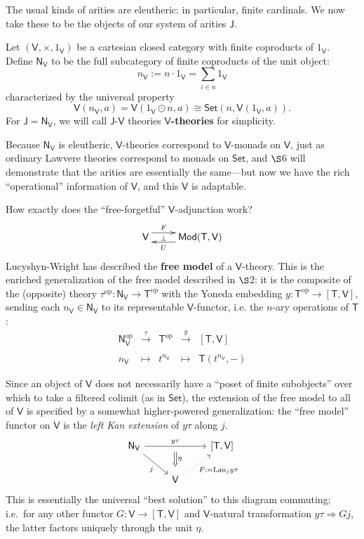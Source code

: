 \documentclass{amsart}
\theoremstyle{definition}
\newcommand{\Set}{\mathsf{Set}}
\newcommand{\Mod}{\mathsf{Mod}}
\newcommand{\NN}{\mathsf{N}}
\newcommand{\V}{\mathsf{V}}
\newcommand{\J}{\mathsf{J}}
\newcommand{\T}{\mathsf{T}}
\newcommand{\op}{\mathrm{op}}
\newcommand{\maps}{\colon}
\begin{document}
The usual kinds of arities are eleutheric: in particular, finite cardinals.  We now take these to be the objects of our system of arities $\J$.

Let $(\V,\times,1_\V)$ be a cartesian closed category with finite coproducts of $1_\V$. Define $\NN_\V$ to be the full subcategory of finite coproducts of the unit object:
\[   n_\V := n \cdot 1_\V = \sum_{i \in n} 1_\V  \]
characterized by the universal property
\begin{equation}
\V(n_\V,a) = \V(1_\V \odot n,a) \cong \Set(n,\V(1_\V,a)).
\end{equation}
For $\J = \NN_\V$, we will call $\J$-$\V$ theories \textbf{$\V$-theories} for simplicity.

Because $\NN_\V$ is eleutheric, $\V$-theories correspond to $\V$-monads on $\V$, just as ordinary Lawvere theories correspond to monads on $\Set$, and $\S$6 will demonstrate that the arities are essentially the same---but now we have the rich ``operational'' information of $\V$, and this $\V$ is adaptable.

How exactly does the ``free-forgetful'' $\V$-adjunction work?
\[
\xymatrix{
\V \ar@<1.1ex>[r]^-F_-\bot &
\Mod(\T,\V) \ar@<1.1ex>[l]^-U
}\]
Lucyshyn-Wright \cite[Sec.\ 8]{rbb} has described the \textbf{free model} of a $\V$-theory.  This is the enriched generalization of the free model described in $\S$2: it is the composite of the (opposite) theory $\tau^\op\maps \NN_\V \to \T^\op$ with the Yoneda embedding $y\maps \T^\op \to [\T,\V]$, sending each $n_\V \in \NN_\V$ to its representable $\V$-functor, i.e. the $n$-ary operations of $\T$:
\[\begin{array}{rllll}
\NN_\V^\op & \xrightarrow{\tau} & \T^\op & \xrightarrow{y} & \left[\T,\V\right]\\
\\
n_\V & \mapsto & t^{n_\V} & \mapsto & \T(t^{n_\V},-)
\end{array}\]

Since an object of $\V$ does not necessarily have a ``poset of finite subobjects'' over which to take a filtered colimit (as in $\Set$), the extension of the free model to all of $\V$ is specified by a somewhat higher-powered generalization: the ``free model'' functor on $\V$ is the \textit{left Kan extension} of $y\tau$ along $j$.
\[\begin{tikzcd}
\NN_\V \arrow[rr,"y\tau"{name=y}] \arrow[swap,rd,"j"] & & \left[\T,\V\right]\\
& \V \arrow[swap,dotted, ru,"F:=\mathrm{Lan}_jy\tau"] \arrow[Rightarrow,from=y,"\eta", shorten >=0.2cm,shorten <=.2cm]
\end{tikzcd}\]
This is essentially the universal ``best solution'' to this diagram commuting; i.e.\ for any other functor $G \colon \V \to [\T,\V]$ and $\V$-natural transformation $y\tau \Rightarrow Gj$, the latter factors uniquely through the unit $\eta$.
\end{document}
